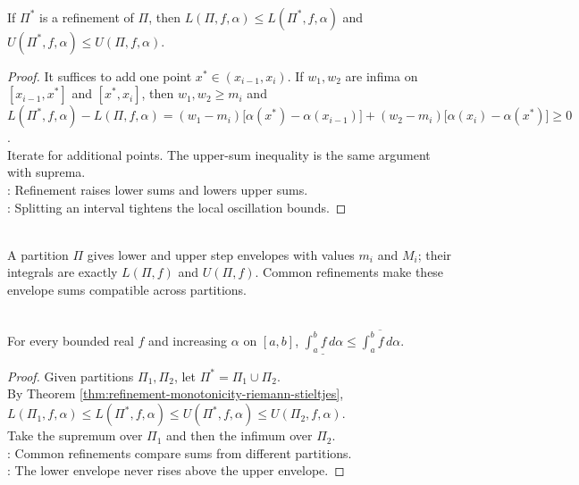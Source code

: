 \begin{theorem} \label{thm:refinement-monotonicity-riemann-stieltjes} \\
If $\Pi^\ast$ is a refinement of $\Pi$, then $L(\Pi,f,\alpha)\leq L(\Pi^\ast,f,\alpha)$ and $U(\Pi^\ast,f,\alpha)\leq U(\Pi,f,\alpha)$.
\begin{proof}
It suffices to add one point $x^\ast\in(x_{i-1},x_i)$. If $w_1,w_2$ are infima on $[x_{i-1},x^\ast]$ and $[x^\ast,x_i]$, then $w_1,w_2\geq m_i$ and $L(\Pi^\ast,f,\alpha)-L(\Pi,f,\alpha) =(w_1-m_i)\bigl[\alpha(x^\ast)-\alpha(x_{i-1})\bigr] +(w_2-m_i)\bigl[\alpha(x_i)-\alpha(x^\ast)\bigr]\geq0$.\\
Iterate for additional points. The upper-sum inequality is the same argument with suprema.\\
: Refinement raises lower sums and lowers upper sums.\\
: Splitting an interval tightens the local oscillation bounds.
\end{proof}
\end{theorem}

\begin{perspective} \label{per:piecewise-constant-envelope-view} \\
A partition $\Pi$ gives lower and upper step envelopes with values $m_i$ and $M_i$; their integrals are exactly $L(\Pi,f)$ and $U(\Pi,f)$. Common refinements make these envelope sums compatible across partitions.
\end{perspective}

\begin{theorem} \label{thm:lower-integral-below-upper-integral} \\
For every bounded real $f$ and increasing $\alpha$ on $[a,b]$, $\underline{\int_a^b f\,d\alpha}\leq \overline{\int_a^b f\,d\alpha}$.
\begin{proof}
Given partitions $\Pi_1,\Pi_2$, let $\Pi^\ast=\Pi_1\cup \Pi_2$.\\
By Theorem \ref{thm:refinement-monotonicity-riemann-stieltjes}, $L(\Pi_1,f,\alpha)\leq L(\Pi^\ast,f,\alpha)\leq U(\Pi^\ast,f,\alpha)\leq U(\Pi_2,f,\alpha)$.\\
Take the supremum over $\Pi_1$ and then the infimum over $\Pi_2$.\\
: Common refinements compare sums from different partitions.\\
: The lower envelope never rises above the upper envelope.
\end{proof}
\end{theorem}

